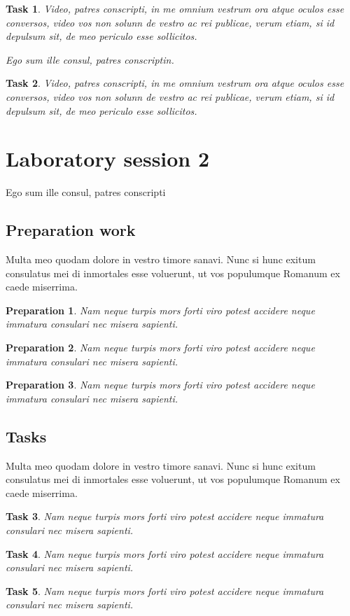\documentclass[12pt, a4paper, twoside, english]{article}
\newcounter{prep}[section]
\newcounter{task}[section]
\newcounter{labnumber}
\newtheorem{prep}{Preparation}
\newtheorem{task}{Task}
\begin{document}
	\begin{task}
		Video, patres conscripti, in me omnium vestrum ora atque oculos esse conversos, video vos non solunn de vestro ac rei publicae, verum etiam, si id depulsum sit, de meo periculo esse sollicitos. 
 		
		Ego sum ille consul, patres conscriptin. 
	\end{task} 
	

	\begin{task}
		Video, patres conscripti, in me omnium vestrum ora atque oculos esse conversos, video vos non solunn de vestro ac rei publicae, verum etiam, si id depulsum sit, de meo periculo esse sollicitos. 
	\end{task}
		
	

\newpage 

\section{Laboratory session 2}
\setcounter{labnumber}{2}
Ego sum ille consul, patres  conscripti

\subsection{Preparation work}
\label{sec:prep2}
Multa meo quodam dolore in vestro timore sanavi. Nunc si hunc exitum consulatus mei di inmortales esse voluerunt, ut vos populumque Romanum ex caede miserrima.

\begin{prep}
	Nam neque turpis mors forti viro potest accidere neque immatura consulari nec misera sapienti. 
\end{prep}

\begin{prep}
	Nam neque turpis mors forti viro potest accidere neque immatura consulari nec misera sapienti. 
\end{prep} 

\begin{prep}
	Nam neque turpis mors forti viro potest accidere neque immatura consulari nec misera sapienti. 
\end{prep}


\subsection{Tasks}
Multa meo quodam dolore in vestro timore sanavi. Nunc si hunc exitum consulatus mei di inmortales esse voluerunt, ut vos populumque Romanum ex caede miserrima.

\begin{task}
	Nam neque turpis mors forti viro potest accidere neque immatura consulari nec misera sapienti. 
\end{task}

\begin{task}
	Nam neque turpis mors forti viro potest accidere neque immatura consulari nec misera sapienti. 
\end{task}


\begin{task}
	Nam neque turpis mors forti viro potest accidere neque immatura consulari nec misera sapienti. 
\end{task}
\end{document}
